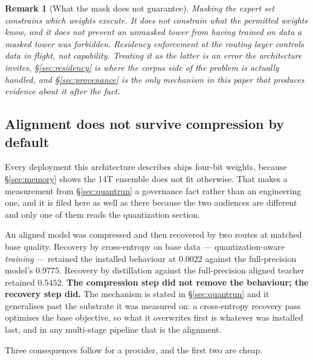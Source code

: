 \documentclass[11pt]{article}
\newtheorem{remark}{Remark}
\begin{document}
\begin{remark}[What the mask does not guarantee]
Masking the expert set constrains \emph{which weights execute}. It does not constrain what the permitted weights know, and it does not prevent an unmasked tower from having trained on data a masked tower was forbidden. Residency enforcement at the routing layer controls data in flight, not capability. Treating it as the latter is an error the architecture invites, \S\ref{sec:residency} is where the corpus side of the problem is actually handled, and \S\ref{sec:provenance} is the only mechanism in this paper that produces evidence about it after the fact.
\end{remark}

\subsection{Alignment does not survive compression by default}
\label{sec:compression}

Every deployment this architecture describes ships four-bit weights, because \S\ref{sec:memory} shows the 14T ensemble does not fit otherwise. That makes a measurement from \S\ref{sec:quantrun} a governance fact rather than an engineering one, and it is filed here as well as there because the two audiences are different and only one of them reads the quantization section.

An aligned model was compressed and then recovered by two routes at matched base quality. Recovery by cross-entropy on base data --- quantization-aware \emph{training} --- retained the installed behaviour at $0.0022$ against the full-precision model's $0.9775$. Recovery by distillation against the full-precision aligned teacher retained $0.5452$. \textbf{The compression step did not remove the behaviour; the recovery step did.} The mechanism is stated in \S\ref{sec:quantrun} and it generalises past the substrate it was measured on: a cross-entropy recovery pass optimises the base objective, so what it overwrites first is whatever was installed last, and in any multi-stage pipeline that is the alignment.

Three consequences follow for a provider, and the first two are cheap.
\end{document}
